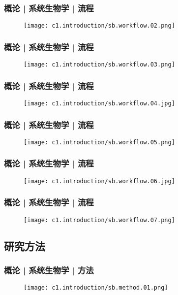\begin{frame}
  \frametitle{概论 | 系统生物学 | 流程}
  \begin{figure}
    \centering
    \texttt{[image: c1.introduction/sb.workflow.02.png]}
  \end{figure}
\end{frame}

\begin{frame}
  \frametitle{概论 | 系统生物学 | 流程}
  \begin{figure}
    \centering
    \texttt{[image: c1.introduction/sb.workflow.03.png]}
  \end{figure}
\end{frame}

\begin{frame}
  \frametitle{概论 | 系统生物学 | 流程}
  \begin{figure}
    \centering
    \texttt{[image: c1.introduction/sb.workflow.04.jpg]}
  \end{figure}
\end{frame}

\begin{frame}
  \frametitle{概论 | 系统生物学 | 流程}
  \begin{figure}
    \centering
    \texttt{[image: c1.introduction/sb.workflow.05.png]}
  \end{figure}
\end{frame}

\begin{frame}
  \frametitle{概论 | 系统生物学 | 流程}
  \begin{figure}
    \centering
    \texttt{[image: c1.introduction/sb.workflow.06.jpg]}
  \end{figure}
\end{frame}

\begin{frame}
  \frametitle{概论 | 系统生物学 | 流程}
  \begin{figure}
    \centering
    \texttt{[image: c1.introduction/sb.workflow.07.png]}
  \end{figure}
\end{frame}

\subsection{研究方法}
\begin{frame}
  \frametitle{概论 | 系统生物学 | 方法}
  \begin{figure}
    \centering
    \texttt{[image: c1.introduction/sb.method.01.png]}
  \end{figure}
\end{frame}

